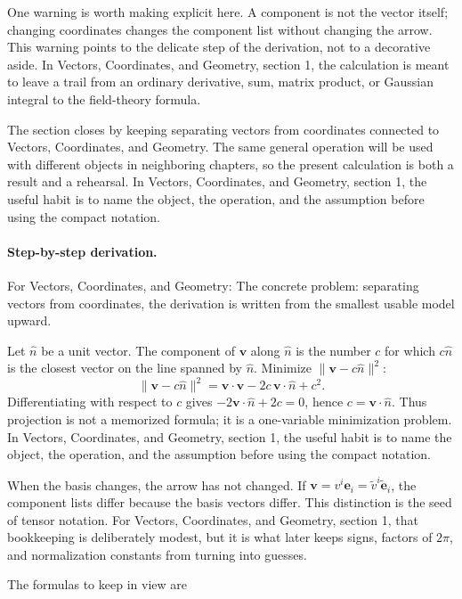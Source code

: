 One warning is worth making explicit here.  A component is not the vector itself; changing coordinates changes the component list without changing the arrow.  This warning points to the delicate step of the derivation, not to a decorative aside.  In Vectors, Coordinates, and Geometry, section 1, the calculation is meant to leave a trail from an ordinary derivative, sum, matrix product, or Gaussian integral to the field-theory formula.

The section closes by keeping separating vectors from coordinates connected to Vectors, Coordinates, and Geometry.  The same general operation will be used with different objects in neighboring chapters, so the present calculation is both a result and a rehearsal.  In Vectors, Coordinates, and Geometry, section 1, the useful habit is to name the object, the operation, and the assumption before using the compact notation.



\paragraph{Step-by-step derivation.}

For Vectors, Coordinates, and Geometry: The concrete problem: separating vectors from coordinates, the derivation is written from the smallest usable model upward.

Let \(\hat n\) be a unit vector.  The component of \(\bm v\) along \(\hat n\) is the number \(c\) for which \(c\hat n\) is the closest vector on the line spanned by \(\hat n\).  Minimize \(\|\bm v-c\hat n\|^2\):
\[
  \|\bm v-c\hat n\|^2=\bm v\cdot\bm v-2c\,\bm v\cdot\hat n+c^2.
\]
Differentiating with respect to \(c\) gives \(-2\bm v\cdot\hat n+2c=0\), hence \(c=\bm v\cdot\hat n\).  Thus projection is not a memorized formula; it is a one-variable minimization problem.  In Vectors, Coordinates, and Geometry, section 1, the useful habit is to name the object, the operation, and the assumption before using the compact notation.

When the basis changes, the arrow has not changed.  If \(\bm v=v^i\bm e_i=\tilde v^i\tilde{\bm e}_i\), the component lists differ because the basis vectors differ.  This distinction is the seed of tensor notation.  For Vectors, Coordinates, and Geometry, section 1, that bookkeeping is deliberately modest, but it is what later keeps signs, factors of \(2\pi\), and normalization constants from turning into guesses.

The formulas to keep in view are

